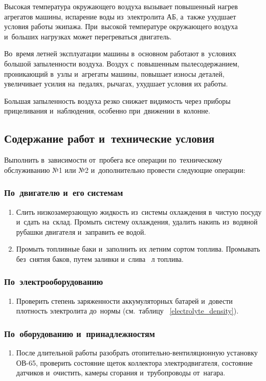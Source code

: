Высокая температура окружающего воздуха вызывает повышенный нагрев агрегатов машины, испарение воды из~электролита АБ, а~также ухудшает условия работы экипажа.  При~высокой температуре окружающего воздуха и~больших нагрузках может перегреваться двигатель.

Во~время летней эксплуатации машины в~основном работают в~условиях большой запыленности воздуха. Воздух с~повышенным пылесодержанием, проникающий в~узлы и~агрегаты машины, повышает износы деталей, увеличивает усилия на~педалях, рычагах, ухудшает условия их работы.

Большая запыленность воздуха резко снижает видимость через приборы прицеливания и~наблюдения, особенно при~движении в~колонне.


\subsection{Содержание работ и~технические условия}
Выполнить в~зависимости от~пробега все операции по~техническому обслуживанию №1 или №2 и~дополнительно провести следующие операции: 

\subsubsection{По~двигателю и~его системам}
\begin{enumerate}
    \item Слить низкозамерзающую жидкость из~системы охлаждения в~чистую посуду и~сдать на~склад. Промыть систему охлаждения, удалить накипь из~водяной рубашки двигателя и~заправить ее водой. 
    \item Промыть топливные баки и~заполнить их летним сортом топлива.   Промывать без~снятия баков, путем заливки и~слива ~л топлива.
\end{enumerate}

\subsubsection{По~электрооборудованию}
\begin{enumerate}
    \item Проверить степень заряженности аккумуляторных батарей и~довести плотность электролита до~нормы (см.~таблицу ~\ref{electrolyte_density}).
\end{enumerate}

\subsubsection{По~оборудованию и~принадлежностям}
\begin{enumerate}
    \item После 	длительной 	работы 	разобрать отопительно-вентиляционную установку ОВ-65, проверить состояние щеток коллектора электродвигателя, состояние датчиков и~очистить, камеры сгорания и~трубопроводы от~нагара.
\end{enumerate}

